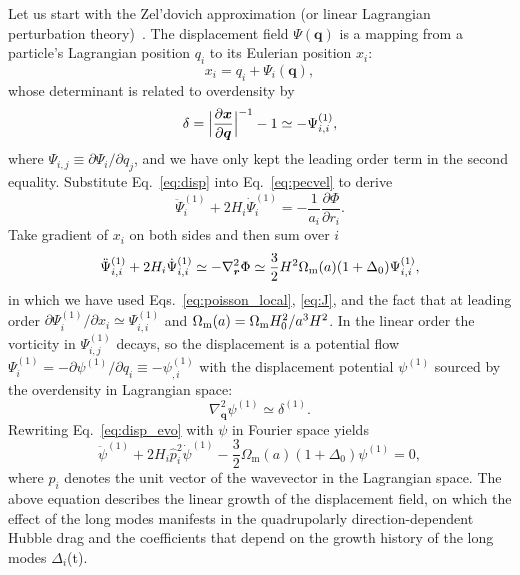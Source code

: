 \documentclass[a4paper,11pt]{article}
\newcommand{\vr}{{\bm r}}
\newcommand{\vx}{{\bm x}}
\newcommand{\vq}{{\bm q}}
\begin{document}
Let us start with the Zel'dovich approximation (or linear Lagrangian
perturbation theory)~\cite{Zeldovich:1969}.
The displacement field $\Psi({\vq})$ is a mapping from a particle's Lagrangian
position $q_i$ to its Eulerian position $x_i$:
\begin{equation}
    x_i = q_i + \Psi_i({\vq}),
    \label{eq:disp}
\end{equation}
whose determinant is related to overdensity by
\begin{equation}
    \delta = \Bigl| \frac{\partial{\vx}}{\partial{\vq}} \Bigr|^{-1} - 1
    \simeq - \Psi_{i,i}^{(1)},
    \label{eq:J}
\end{equation}
where $\Psi_{i,j} \equiv \partial\Psi_i / \partial q_j$, and we have only kept
the leading order term in the second equality.
Substitute Eq.~\eqref{eq:disp} into Eq.~\eqref{eq:pecvel} to derive
\begin{equation}
    \ddot \Psi_i^{(1)} + 2 H_i \dot \Psi_i^{(1)} = - \frac1{a_i}
    \frac{\partial\Phi}{\partial r_i}.
\end{equation}
Take gradient of $x_i$ on both sides and then sum over $i$
\begin{equation}
    \ddot \Psi_{i,i}^{(1)} + 2 H_i \dot \Psi_{i,i}^{(1)} \simeq - \nabla_{\vr}^2 \Phi
    \simeq \frac{3}{2}H^2 \Omega_{\rm m}(a)  (1 + \Delta_0)\Psi_{i,i}^{(1)},
    \label{eq:disp_evo}
\end{equation}
in which we have used Eqs.~\eqref{eq:poisson_local}, \eqref{eq:J}, and the fact that at leading
order $\partial\Psi_i^{(1)} / \partial x_i \simeq \Psi_{i,i}^{(1)}$
and $\Omega_{\rm m}(a) =  \Omega_{\rm m}H_0^2/a^3H^2$.
In the linear order the vorticity in $\Psi_{i,j}^{(1)}$ decays, so the displacement
is a potential flow $\Psi_i^{(1)} = - \partial\psi^{(1)}/ \partial q_i \equiv -\psi_{,i}^{(1)}$
with the displacement potential $\psi^{(1)}$ sourced by the overdensity in Lagrangian
space:
\begin{equation}
    \nabla_{\vq}^2 \psi^{(1)} \simeq \delta^{(1)}.
\end{equation}
Rewriting Eq.~\eqref{eq:disp_evo} with $\psi$ in Fourier space yields
\begin{equation}
   \ddot \psi^{(1)} + 2 H_i \hat p_i^2   \dot\psi^{(1)}
    - \frac32 \Omega_\mathrm{m}(a) (1 + \Delta_0) \psi^{(1)} = 0,
    \label{pot_evo}
\end{equation}
where $\hat p_i$ denotes the unit vector of the wavevector
in the Lagrangian space.
The above equation describes the linear growth of the displacement field, on
which the effect of the long modes manifests in the quadrupolarly
direction-dependent Hubble drag and the coefficients that depend on the growth
history of the long modes $\Delta_i$(t).
\end{document}
